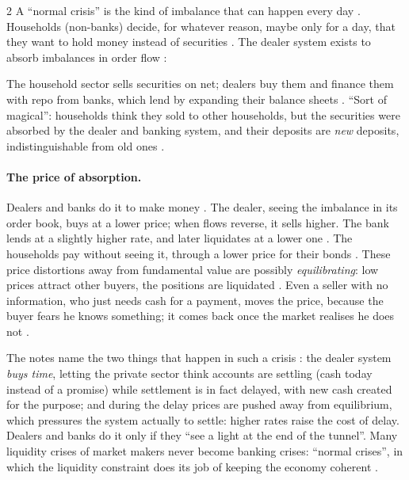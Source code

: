 \begin{paracol}{2}
A ``normal crisis'' is the kind of imbalance that can happen every day . Households (non-banks) decide, for whatever reason, maybe only for a day, that they
want to hold money instead of securities . The dealer system exists to absorb imbalances in order flow :
\begin{taccts}
\quad
{}\quad
{}
\end{taccts}
The household sector sells securities on net; dealers buy them and finance them with repo from banks, which lend by expanding their balance sheets
. ``Sort of magical'': households think they sold to other households, but the securities were absorbed by the dealer and
banking system, and their deposits are \emph{new} deposits, indistinguishable from old ones .

\paragraph{The price of absorption.} Dealers and banks do it to make money . The dealer, seeing the imbalance in its order book, buys at a lower price; when
flows reverse, it sells higher. The bank lends at a slightly higher rate, and later liquidates at a lower one .
The households pay without seeing it, through a lower price for their bonds . These price distortions away from fundamental value are
possibly \emph{equilibrating}: low prices attract other buyers, the positions are liquidated . Even a seller with no information, who just needs
cash for a payment, moves the price, because the buyer fears he knows something; it comes back once the market realises he does not .

The notes name the two things that happen in such a crisis : the dealer system \emph{buys time}, letting the private sector think accounts are settling (cash today instead of a
promise) while settlement is in fact delayed, with new cash created for the purpose; and during the delay prices are pushed away from equilibrium, which pressures the system actually to settle:
higher rates raise the cost of delay. Dealers and banks do it only if they ``see a light at the end of the tunnel''. Many liquidity crises of market makers never become banking crises: ``normal
crises'', in which the liquidity constraint does its job of keeping the economy coherent .


\end{paracol}
